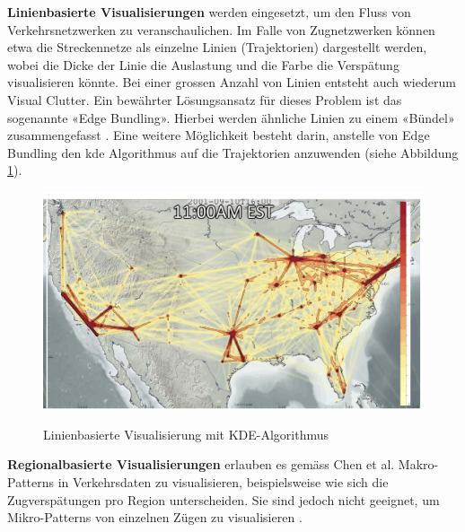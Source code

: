 \textbf{Linienbasierte Visualisierungen} werden eingesetzt, um den Fluss von Verkehrsnetzwerken zu veranschaulichen. Im Falle von Zugnetzwerken können etwa die Streckennetze als einzelne Linien (Trajektorien) dargestellt werden, wobei die Dicke der Linie die Auslastung und die Farbe die Verspätung visualisieren könnte. Bei einer grossen Anzahl von Linien entsteht auch wiederum Visual Clutter. Ein bewährter Lösungsansatz für dieses Problem ist das sogenannte «Edge Bundling». Hierbei werden ähnliche Linien zu einem «Bündel» zusammengefasst \parencite[S. 2974 - 2976]{survey_traffic_data_visualization_2015}. Eine weitere Möglichkeit besteht darin, anstelle von Edge Bundling den \acrshort{kde} Algorithmus auf die Trajektorien anzuwenden (siehe Abbildung \ref{fig_line_kde}).

\begin{figure}[H]
    \caption{Linienbasierte Visualisierung mit KDE-Algorithmus \parencite[S. 7]{streaming_data_kde}}
    \includegraphics[width=.5\linewidth]{content/00_assets/line_visualization_kde.png}
    \label{fig_line_kde}
\end{figure}

\textbf{Regionalbasierte Visualisierungen} erlauben es gemäss Chen et al. Makro-Patterns in Verkehrsdaten zu visualisieren, beispielsweise wie sich die Zugverspätungen pro Region unterscheiden. Sie sind jedoch nicht geeignet, um Mikro-Patterns von einzelnen Zügen zu visualisieren \parencite[S. 2976]{survey_traffic_data_visualization_2015}.

